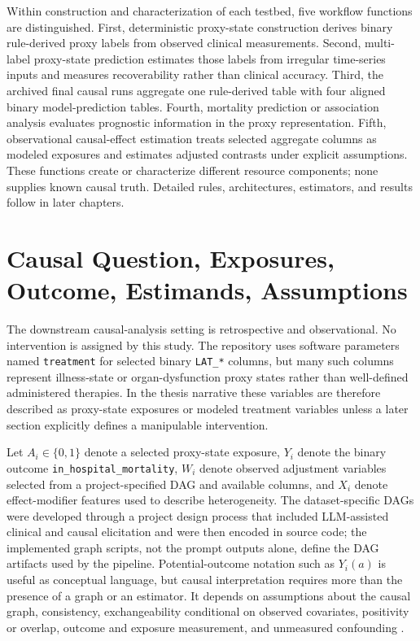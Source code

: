 Within construction and characterization of each testbed, five workflow functions are distinguished.  First, deterministic proxy-state construction derives binary rule-derived proxy labels from observed clinical measurements.  Second, multi-label proxy-state prediction estimates those labels from irregular time-series inputs and measures recoverability rather than clinical accuracy.  Third, the archived final causal runs aggregate one rule-derived table with four aligned binary model-prediction tables.  Fourth, mortality prediction or association analysis evaluates prognostic information in the proxy representation.  Fifth, observational causal-effect estimation treats selected aggregate columns as modeled exposures and estimates adjusted contrasts under explicit assumptions.  These functions create or characterize different resource components; none supplies known causal truth.  Detailed rules, architectures, estimators, and results follow in later chapters.

\section{Causal Question, Exposures, Outcome, Estimands, Assumptions}
\label{sec:problem-definition-study-design:causal-question-exposures-outcome-estimands-assumptions}

The downstream causal-analysis setting is retrospective and observational.  No intervention is assigned by this study.  The repository uses software parameters named \texttt{treatment} for selected binary \texttt{LAT\_*} columns, but many such columns represent illness-state or organ-dysfunction proxy states rather than well-defined administered therapies.  In the thesis narrative these variables are therefore described as proxy-state exposures or modeled treatment variables unless a later section explicitly defines a manipulable intervention.

Let \(A_i\in\{0,1\}\) denote a selected proxy-state exposure, \(Y_i\) denote the binary outcome \texttt{in\_hospital\_mortality}, \(W_i\) denote observed adjustment variables selected from a project-specified DAG and available columns, and \(X_i\) denote effect-modifier features used to describe heterogeneity.  The dataset-specific DAGs were developed through a project design process that included LLM-assisted clinical and causal elicitation and were then encoded in source code; the implemented graph scripts, not the prompt outputs alone, define the DAG artifacts used by the pipeline.  Potential-outcome notation such as \(Y_i(a)\) is useful as conceptual language, but causal interpretation requires more than the presence of a graph or an estimator.  It depends on assumptions about the causal graph, consistency, exchangeability conditional on observed covariates, positivity or overlap, outcome and exposure measurement, and unmeasured confounding \cite{pearl_1995_causal_diagrams,hernan_robins_2016_target_trial,hernan_taubman_2008_well_defined_interventions}.

